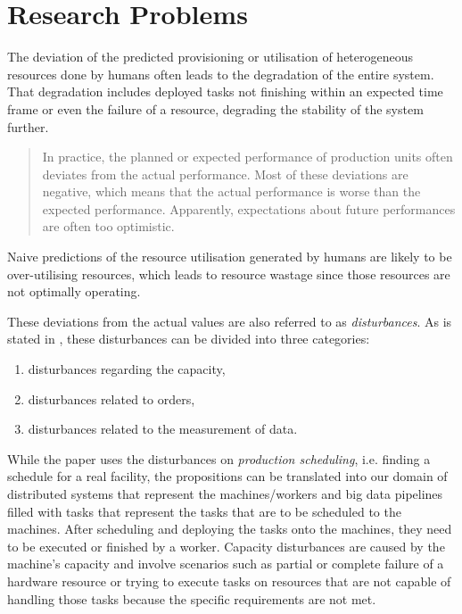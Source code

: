         \section{Research Problems}
        \label{sec:research-problems-introduction}

        The deviation of the predicted provisioning or utilisation of heterogeneous resources done by humans often leads to the degradation of the entire system. That degradation includes deployed tasks not finishing within an expected time frame or even the failure of a resource, degrading the stability of the system further.
        \begin{quote}
            In practice, the planned or expected performance of production units often deviates from the actual performance. Most of these deviations are negative, which means that the actual performance is worse than the expected performance. Apparently, expectations about future performances are often too optimistic. \cite{stoopComplexitySchedulingPractice1996}
        \end{quote}
        Naive predictions of the resource utilisation generated by humans are likely to be over-utilising resources, which leads to resource wastage since those resources are not optimally operating. 
        
        These deviations from the actual values are also referred to as \emph{disturbances}.
        As is stated in \cite{stoopComplexitySchedulingPractice1996}, these disturbances can be divided into three categories:
        \begin{enumerate}
            \item disturbances regarding the capacity,
            \item disturbances related to orders,
            \item disturbances related to the measurement of data.
        \end{enumerate}
        While the paper uses the disturbances on \emph{production scheduling}, i.e. finding a schedule for a real facility, the propositions can be translated into our domain of distributed systems that represent the machines/workers and big data pipelines filled with tasks that represent the tasks that are to be scheduled to the machines. After scheduling and deploying the tasks onto the machines, they need to be executed or finished by a worker.
        Capacity disturbances are caused by the machine's capacity and involve scenarios such as partial or complete failure of a hardware resource or trying to execute tasks on resources that are not capable of handling those tasks because the specific requirements are not met. 

